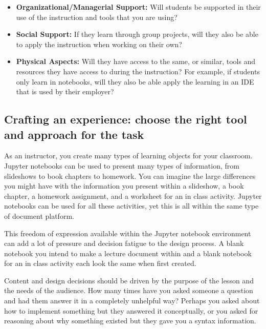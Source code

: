 \documentclass[]{book}
\providecommand{\tightlist}{%
  \setlength{\itemsep}{0pt}\setlength{\parskip}{0pt}}
\begin{document}
\begin{itemize}
\tightlist
\item
  \textbf{Organizational/Managerial Support:} Will students be supported in their
  use of the instruction and tools that you are using?
\item
  \textbf{Social Support:} If they learn through group projects, will they also be
  able to apply the instruction when working on their own?
\item
  \textbf{Physical Aspects:} Will they have access to the same, or similar, tools
  and resources they have access to during the instruction? For example, if
  students only learn in notebooks, will they also be able apply the learning
  in an IDE that is used by their employer?
\end{itemize}

\hypertarget{crafting-an-experience-choose-the-right-tool-and-approach-for-the-task}{%
\subsection{Crafting an experience: choose the right tool and approach for the task}\label{crafting-an-experience-choose-the-right-tool-and-approach-for-the-task}}

As an instructor, you create many types of learning objects for your classroom.
Jupyter notebooks can be used to present many types of information, from
slideshows to book chapters to homework. You can imagine the large differences
you might have with the information you present within a slideshow, a book
chapter, a homework assignment, and a worksheet for an in class activity.
Jupyter notebooks can be used for all these activities, yet this is all within
the same type of document platform.

This freedom of expression available within the Jupyter notebook environment can
add a lot of pressure and decision fatigue to the design process. A blank
notebook you intend to make a lecture document within and a blank notebook for
an in class activity each look the same when first created.

Content and design decisions should be driven by the purpose of the lesson and
the needs of the audience. How many times have you asked someone a question and
had them answer it in a completely unhelpful way? Perhaps you asked about how to
implement something but they answered it conceptually, or you asked for
reasoning about why something existed but they gave you a syntax information.
\end{document}

